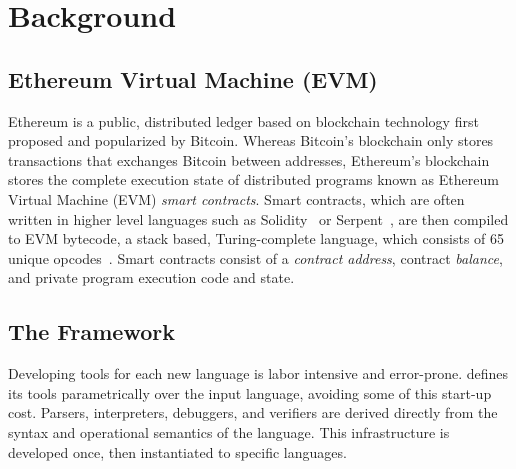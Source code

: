 \section{Background}

\subsection{Ethereum Virtual Machine (EVM)}

Ethereum is a public, distributed ledger based on blockchain technology first
proposed and popularized by Bitcoin. Whereas Bitcoin's blockchain only stores
transactions that exchanges Bitcoin between addresses, Ethereum's blockchain
stores the complete execution state of distributed programs known as Ethereum
Virtual Machine (EVM) \textit{smart contracts}. Smart contracts, which are often
written in higher level languages such as Solidity~\cite{solidity} or
Serpent~\cite{serpent}, are then compiled to EVM
bytecode, a stack based, Turing-complete language, which consists of 65 unique opcodes~\cite{wood2014ethereum}. Smart
contracts consist of a \textit{contract address}, contract \textit{balance}, and
private program execution code and state.


\subsection{The \K{} Framework}

Developing tools for each new language is labor intensive and error-prone. \K{}
defines its tools parametrically over the input language, avoiding some of this
start-up cost. Parsers, interpreters, debuggers, and verifiers are derived
directly from the syntax and operational semantics of the language. This
infrastructure is developed once, then instantiated to specific
languages.~\cite{stefanescu-park-yuwen-li-rosu-2016-oopsla}

